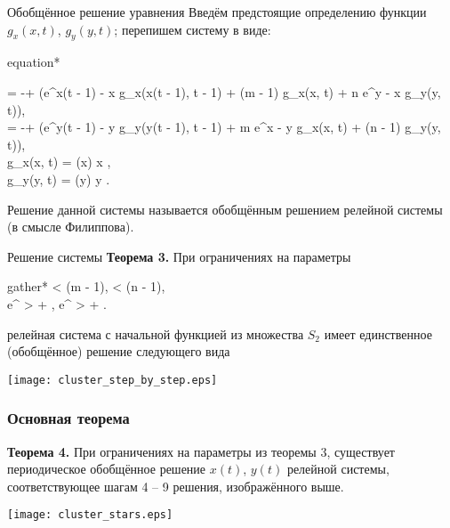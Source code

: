 \begin{frame}{Обобщённое решение уравнения}
	Введём предстоящие определению функции $g_x(x, t)$, $g_y(y, t)$; перепишем систему в виде:
	\footnotesize
	\begin{empheq}[box=\myeq]{equation*}
		\begin{cases}
			 = -\beta + \alpha \left(e^{x(t - 1) - x} g_x(x(t - 1), t - 1) + \delta (m - 1) g_x(x, t) + \delta n e^{y - x} g_y(y, t)\right),\\
			 = -\beta + \alpha \left(e^{y(t - 1) - y} g_y(y(t - 1), t - 1) + \delta m e^{x - y} g_x(x, t) + \delta (n - 1) g_y(y, t)\right),\\
			g_x(x, t) = (x)  x ,\\
			g_y(y, t) = (y)  y . 
		\end{cases}
	\end{empheq}
	\normalsize
		
	Решение данной системы называется обобщённым решением релейной системы (в смысле Филиппова).
	
\end{frame}

\begin{frame}{Решение системы}
	\textbf{Теорема 3.} При ограничениях на параметры
	\footnotesize
	\begin{empheq}[box=\myeq]{gather*}
		\label{eq:constraint_2}
		\beta < \alpha \delta (m - 1), \quad \beta < \alpha \delta (n - 1),\\
		\label{eq:constraint_3}
		e^{\beta} \cdot {} >  + , \quad
		e^{\beta} \cdot {} >  + .
	\end{empheq}
	\normalsize
	релейная система с начальной функцией из множества $S_2$ имеет единственное (обобщённое) решение следующего вида
	\begin{center}
	\texttt{[image: cluster\_step\_by\_step.eps]}
	\end{center}
\end{frame}


\begin{frame}
	\frametitle{Основная теорема}
	\textbf{Теорема 4.} При ограничениях на параметры из теоремы 3, существует периодическое обобщённое решение $x(t)$, $y(t)$ релейной системы, соответствующее шагам 4 -- 9 решения, изображённого выше.
	
	\begin{center}
		\texttt{[image: cluster\_stars.eps]}
	\end{center}
\end{frame}

